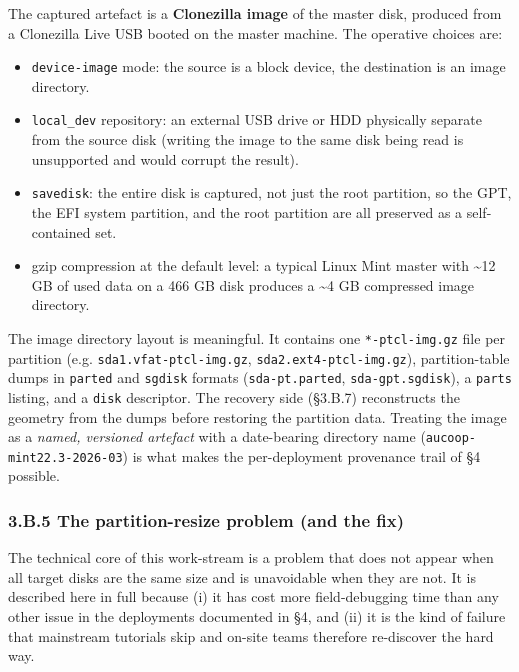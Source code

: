 The captured artefact is a \textbf{Clonezilla image} of the master disk,
produced from a Clonezilla Live USB booted on the master machine. The
operative choices are:

\begin{itemize}
\tightlist
\item
  \texttt{device-image} mode: the source is a block device, the
  destination is an image directory.
\item
  \texttt{local\_dev} repository: an external USB drive or HDD
  physically separate from the source disk (writing the image to the
  same disk being read is unsupported and would corrupt the result).
\item
  \texttt{savedisk}: the entire disk is captured, not just the root
  partition, so the GPT, the EFI system partition, and the root
  partition are all preserved as a self-contained set.
\item
  gzip compression at the default level: a typical Linux Mint master
  with \textasciitilde12 GB of used data on a 466 GB disk produces a
  \textasciitilde4 GB compressed image directory.
\end{itemize}

The image directory layout is meaningful. It contains one
\texttt{*-ptcl-img.gz} file per partition (e.g.
\texttt{sda1.vfat-ptcl-img.gz}, \texttt{sda2.ext4-ptcl-img.gz}),
partition-table dumps in \texttt{parted} and \texttt{sgdisk} formats
(\texttt{sda-pt.parted}, \texttt{sda-gpt.sgdisk}), a \texttt{parts}
listing, and a \texttt{disk} descriptor. The recovery side (§3.B.7)
reconstructs the geometry from the dumps before restoring the partition
data. Treating the image as a \emph{named, versioned artefact} with a
date-bearing directory name (\texttt{aucoop-mint22.3-2026-03}) is what
makes the per-deployment provenance trail of §4 possible.

\hypertarget{b.5-the-partition-resize-problem-and-the-fix}{%
\subsubsection{3.B.5 The partition-resize problem (and the
fix)}\label{b.5-the-partition-resize-problem-and-the-fix}}

The technical core of this work-stream is a problem that does not appear
when all target disks are the same size and is unavoidable when they are
not. It is described here in full because (i) it has cost more
field-debugging time than any other issue in the deployments documented
in §4, and (ii) it is the kind of failure that mainstream tutorials skip
and on-site teams therefore re-discover the hard way.

